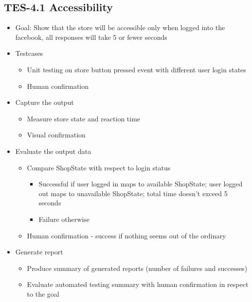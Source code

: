 \subsection{TES-4.1 Accessibility}
\label{subsec:accessibility}
\begin{itemize}
\item Goal: Show that the store will be accessible only when logged into the facebook, all responses will take 5 or fewer seconds

\item Testcases
\begin{itemize}
\item Unit testing on store button pressed event with different user login states
\item Human confirmation
\end{itemize}

\item Capture the output
\begin{itemize}
\item Measure store state and reaction time
\item Visual confirmation
\end{itemize}

\item Evaluate the output data
\begin{itemize}
\item Compare ShopState with respect to login status
\begin{itemize}
\item Successful if user logged in maps to available ShopState; user logged out maps to unavailable ShopState; total time doesn’t exceed 5 seconds
\item Failure otherwise
\end{itemize}
\item Human confirmation - success if nothing seems out of the ordinary
\end{itemize}

\item Generate report
\begin{itemize}
\item Produce summary of generated reports (number of failures and successes)
\item Evaluate automated testing summary with human confirmation in respect to the goal
\end{itemize}
\end{itemize}

